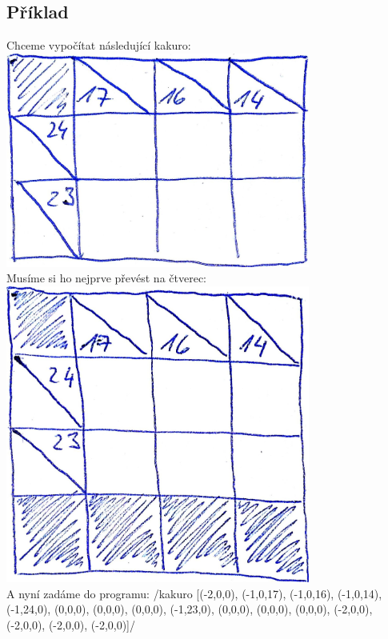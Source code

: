 \subsection*{Příklad}
Chceme vypočítat následující kakuro:\\
\includegraphics[width=0.75\textwidth]{kakurofrom.jpg}\\
Musíme si ho nejprve převést na čtverec:\\
\includegraphics[width=0.75\textwidth]{kakuroto.jpg}\\
A nyní zadáme do programu:
\haskell/kakuro [(-2,0,0), (-1,0,17), (-1,0,16), (-1,0,14), (-1,24,0), (0,0,0), (0,0,0), (0,0,0), (-1,23,0), (0,0,0), (0,0,0), (0,0,0), (-2,0,0), (-2,0,0), (-2,0,0), (-2,0,0)]/


